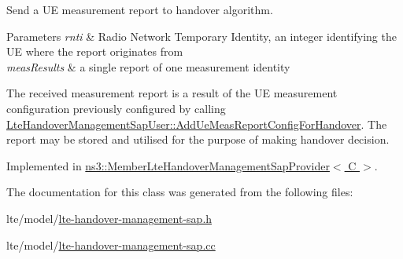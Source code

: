 Send a UE measurement report to handover algorithm. 


\begin{DoxyParams}{Parameters}
{\em rnti} & Radio Network Temporary Identity, an integer identifying the UE where the report originates from \\
\hline
{\em meas\+Results} & a single report of one measurement identity\\
\hline
\end{DoxyParams}
The received measurement report is a result of the UE measurement configuration previously configured by calling \hyperlink{classns3_1_1LteHandoverManagementSapUser_a80f34ec0e586b42547210c1741b4f980}{Lte\+Handover\+Management\+Sap\+User\+::\+Add\+Ue\+Meas\+Report\+Config\+For\+Handover}. The report may be stored and utilised for the purpose of making handover decision. 

Implemented in \hyperlink{classns3_1_1MemberLteHandoverManagementSapProvider_a3db503c2725f690e15bc67d831afe01e}{ns3\+::\+Member\+Lte\+Handover\+Management\+Sap\+Provider$<$ C $>$}.



The documentation for this class was generated from the following files\+:\begin{DoxyCompactItemize}
\item 
lte/model/\hyperlink{lte-handover-management-sap_8h}{lte-\/handover-\/management-\/sap.\+h}\item 
lte/model/\hyperlink{lte-handover-management-sap_8cc}{lte-\/handover-\/management-\/sap.\+cc}\end{DoxyCompactItemize}
